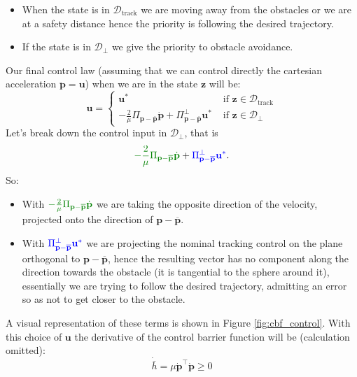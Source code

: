 \documentclass[10pt, a4paper]{report}
\begin{document}
\begin{itemize}
    \item When the state is in $\mathcal D_{\text{track}}$ we are moving away from the obstacles or we are at a safety distance hence the priority is following the desired trajectory.
    \item If the state is in $\mathcal D_\bot$ we give the priority to obstacle avoidance.
\end{itemize}
Our final control law (assuming that we can control directly the cartesian acceleration $\ddot{\mathbf p}=\mathbf u$) when we are in the state $\mathbf z$ will be:\begin{equation}\label{CBF_control}
    \mathbf u = \begin{cases}
        \mathbf u^*&\text{ if }\mathbf z\in\mathcal D_{\text{track}}\\ 
        -\frac{2}{\mu}\Pi_{\mathbf p-\overline{\mathbf p}}\dot{\mathbf p}+\Pi^\bot_{\mathbf p-\overline{\mathbf p}}\mathbf u^*
        &\text{ if }\mathbf z\in\mathcal D_\bot
    \end{cases}
\end{equation}
Let's break down the control input in $\mathcal D_\bot$, that is\begin{equation}
    \greenText{-\frac{2}{\mu}\Pi_{\mathbf p-\overline{\mathbf p}}\dot{\mathbf p}}+\blueText{\Pi^\bot_{\mathbf p-\overline{\mathbf p}}\mathbf u^*}.
\end{equation}
\noindent So:
\begin{itemize}
    \item With $\greenText{-\frac{2}{\mu}\Pi_{\mathbf p-\overline{\mathbf p}}\dot{\mathbf p}}$ we are taking the opposite direction of the velocity, projected onto the direction of $\mathbf p-\overline{\mathbf p}$.
    \item With $\color{blue}\Pi^\bot_{\mathbf p-\overline{\mathbf p}}\mathbf u^*\color{black}$ we are projecting the nominal tracking control on the plane orthogonal to $\mathbf p-\overline{\mathbf p}$, hence the resulting vector has no component along the direction towards the obstacle (it is tangential to the sphere around it), essentially we are trying to follow the desired trajectory, admitting an error so as not to get closer to the obstacle.
\end{itemize}
A visual representation of these terms is shown in Figure \ref{fig:cbf_control}.
With this choice of $\mathbf u$ the derivative of the control barrier function will be (calculation omitted):\begin{equation}
    \dot{\bar h}=\mu\dot{\mathbf p}^\top\dot{\mathbf p}\ge 0
\end{equation}
\end{document}
